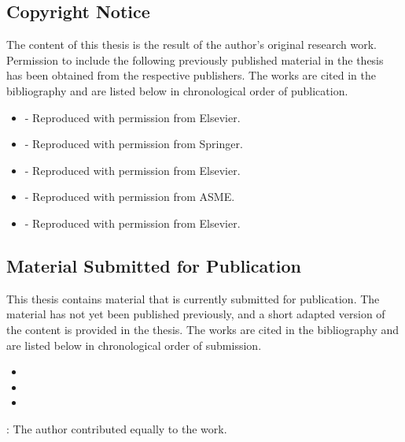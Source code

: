 \documentclass[a4paper, 11pt, openright]{book} %
\date{January 2024}
\makeatletter
\newcommand*{\emptystyles}{%
\let\oldplain\ps@plain
\let\ps@plain\ps@empty
\pagestyle{empty}}
\let\ps@plain\ps@empty%
\makeatother
\begin{document}
\emptystyles

\hbox{}
\thispagestyle{empty}
\newpage

\subsection*{Copyright Notice}

The content of this thesis is the result of the author's original research work. Permission to include the following previously published material in the thesis has been obtained from the respective publishers. The works are cited in the bibliography and are listed below in chronological order of publication.
%
\begin{itemize}
  \item {} -  Reproduced with permission from Elsevier.
  \item {} -  Reproduced with permission from Springer.
  \item {} -  Reproduced with permission from Elsevier.
  \item {} -  Reproduced with permission from ASME.
  \item {} -  Reproduced with permission from Elsevier.
\end{itemize}

\subsection*{Material Submitted for Publication}

This thesis contains material that is currently submitted for publication. The material has not yet been published previously, and a short adapted version of the content is provided in the thesis. The works are cited in the bibliography and are listed below in chronological order of submission.
%
\begin{itemize}
  \item {}
  \item {}
  \item {}
\end{itemize}
%
\dag{}: The author contributed equally to the work.

\vspace*{\fill}
\end{document}
